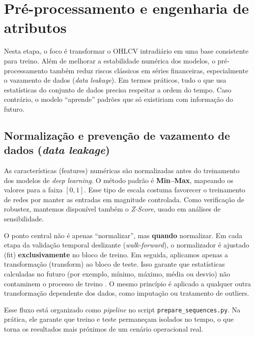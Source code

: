 \section{Pré-processamento e engenharia de atributos}

Nesta etapa, o foco é transformar o OHLCV intradiário em uma base consistente para treino.
Além de melhorar a estabilidade numérica dos modelos, o pré-processamento também reduz riscos
clássicos em séries financeiras, especialmente o vazamento de dados (\textit{data leakage}).
Em termos práticos, tudo o que usa estatísticas do conjunto de dados precisa respeitar a ordem do tempo.
Caso contrário, o modelo “aprende” padrões que só existiriam com informação do futuro.

\subsection{Normalização e prevenção de vazamento de dados (\textit{data leakage})}
As características (features) numéricas são normalizadas antes do treinamento dos modelos de \textit{deep learning}.
O método padrão é \textbf{Min--Max}, mapeando os valores para a faixa $[0,1]$.
Esse tipo de escala costuma favorecer o treinamento de redes por manter as entradas em magnitude controlada.
Como verificação de robustez, mantemos disponível também o \emph{Z-Score}, usado em análises de sensibilidade.

O ponto central não é apenas “normalizar”, mas \textbf{quando} normalizar.
Em cada etapa da validação temporal deslizante (\textit{walk-forward}), o normalizador é ajustado (fit)
\textbf{exclusivamente} no bloco de treino.
Em seguida, aplicamos apenas a transformação (transform) ao bloco de teste.
Isso garante que estatísticas calculadas no futuro (por exemplo, mínimo, máximo, média ou desvio)
não contaminem o processo de treino \cite{lopezdeprado2018,bergmeir2012}.
O mesmo princípio é aplicado a qualquer outra transformação dependente dos dados,
como imputação ou tratamento de outliers.

Esse fluxo está organizado como \textit{pipeline} no script \texttt{prepare\_sequences.py}.
Na prática, ele garante que treino e teste permaneçam isolados no tempo,
o que torna os resultados mais próximos de um cenário operacional real.

